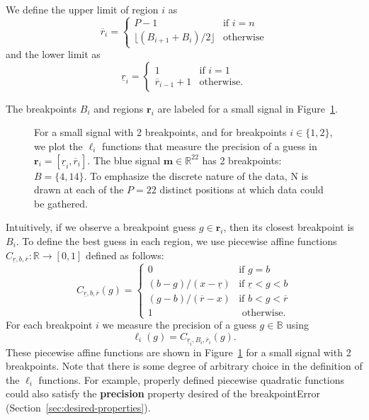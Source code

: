 \documentclass{jsfds} %
\renewcommand{\r}{ \mathbf{ r} }
\newcommand{\rileft}[1][i]{\underline r_{#1}}
\newcommand{\riright}[1][i]{\overline r_{#1}}
\newcommand{\RR}{\mathbb{R}}
\begin{document}
We define the upper limit of region $i$ as
\begin{equation}
  \label{eq:R_i}
\riright
=
  \begin{cases}
    P-1 & \text{if } i=n \\
    \lfloor (B_{i+1}+B_i)/2 \rfloor & \text{otherwise}
  \end{cases}
\end{equation}
and
the lower limit as
\begin{equation}
  \label{eq:L_i}
  \rileft =
  \begin{cases}
    1 & \text{if } i=1 \\
    \riright[i-1]+1 & \text{otherwise}.
  \end{cases}
\end{equation}

The breakpoints $B_i$ and regions $\r_i$ are labeled for a small
signal in Figure~\ref{fig:exact_imprecision}.

\begin{figure}[H]
  \centering
  
  \vskip -0.5cm
  \caption{For a small signal with 2 breakpoints, and for breakpoints
    $i\in\{1, 2\}$, we plot the $\ell_i$ functions that measure the
    precision of a guess in $\mathbf r_i = [\underline r_i, \overline
    r_i]$.  The blue signal $\mathbf m\in\RR^{22}$ has 2 breakpoints:
    $B=\{4,14\}$. To emphasize the discrete nature of the data, N is
    drawn at each of the $P=22$ distinct positions at which data
    could be gathered.}
  \label{fig:exact_imprecision}
\end{figure}


Intuitively, if we observe a breakpoint guess $g\in \r_i$, then its
closest breakpoint is $B_i$. To define the best guess in each region,
we use piecewise affine functions $C_{\underline r,b,\overline
  r}:\RR\rightarrow[0,1]$ defined as follows:
\begin{equation}
  \label{eq:cLxR}
  C_{\underline r,b,\overline r}(g) =
  \begin{cases}
    0 & \text{if }g=b \\
    (b-g)/(x-\underline r) & \text{if } \underline r< g< b \\
    (g-b)/(\overline r-x) & \text{if } b< g< \overline r\\
    1 & \text{ otherwise}.
  \end{cases}
\end{equation}
For each breakpoint $i$ we measure the precision of a guess
$g\in\mathbb B$ using
\begin{equation}
  \label{eq:ell_i_exact}
  \ell_i(g)=C_{\rileft,B_i,\riright}(g).
\end{equation}
These piecewise affine functions are shown in
Figure~\ref{fig:exact_imprecision} for a small signal with 2
breakpoints. Note that there is some degree of arbitrary choice in the
definition of the $\ell_i$ functions. For example, properly defined
piecewise quadratic functions could also satisfy the
\textbf{precision} property desired of the breakpointError
(Section~\ref{sec:desired-properties}).
\end{document}
